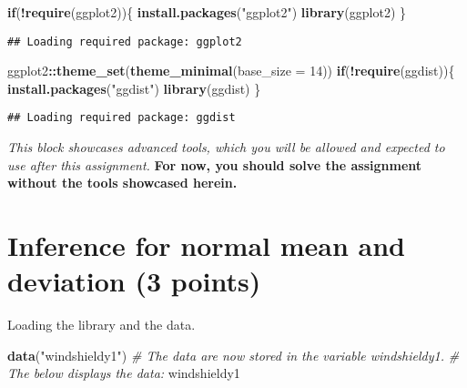\documentclass[
]{article}
\newenvironment{Shaded}{\begin{snugshade}}{\end{snugshade}}
\newcommand{\AttributeTok}[1]{\textcolor[rgb]{0.13,0.29,0.53}{#1}}
\newcommand{\CommentTok}[1]{\textcolor[rgb]{0.56,0.35,0.01}{\textit{#1}}}
\newcommand{\ControlFlowTok}[1]{\textcolor[rgb]{0.13,0.29,0.53}{\textbf{#1}}}
\newcommand{\DecValTok}[1]{\textcolor[rgb]{0.00,0.00,0.81}{#1}}
\newcommand{\FunctionTok}[1]{\textcolor[rgb]{0.13,0.29,0.53}{\textbf{#1}}}
\newcommand{\NormalTok}[1]{#1}
\newcommand{\SpecialCharTok}[1]{\textcolor[rgb]{0.81,0.36,0.00}{\textbf{#1}}}
\newcommand{\StringTok}[1]{\textcolor[rgb]{0.31,0.60,0.02}{#1}}
\begin{document}
\begin{Shaded}
\begin{Highlighting}[]
\ControlFlowTok{if}\NormalTok{(}\SpecialCharTok{!}\FunctionTok{require}\NormalTok{(ggplot2))\{}
    \FunctionTok{install.packages}\NormalTok{(}\StringTok{"ggplot2"}\NormalTok{)}
    \FunctionTok{library}\NormalTok{(ggplot2)}
\NormalTok{\}}
\end{Highlighting}
\end{Shaded}

\begin{verbatim}
## Loading required package: ggplot2
\end{verbatim}

\begin{Shaded}
\begin{Highlighting}[]
\NormalTok{ggplot2}\SpecialCharTok{::}\FunctionTok{theme\_set}\NormalTok{(}\FunctionTok{theme\_minimal}\NormalTok{(}\AttributeTok{base\_size =} \DecValTok{14}\NormalTok{))}
\ControlFlowTok{if}\NormalTok{(}\SpecialCharTok{!}\FunctionTok{require}\NormalTok{(ggdist))\{}
    \FunctionTok{install.packages}\NormalTok{(}\StringTok{"ggdist"}\NormalTok{)}
    \FunctionTok{library}\NormalTok{(ggdist)}
\NormalTok{\}}
\end{Highlighting}
\end{Shaded}

\begin{verbatim}
## Loading required package: ggdist
\end{verbatim}

\emph{This block showcases advanced tools, which you will be allowed and
expected to use after this assignment.} \textbf{For now, you should
solve the assignment without the tools showcased herein.}

\hypertarget{inference-for-normal-mean-and-deviation-3-points}{%
\section{Inference for normal mean and deviation (3
points)}\label{inference-for-normal-mean-and-deviation-3-points}}

Loading the library and the data.

\begin{Shaded}
\begin{Highlighting}[]
\FunctionTok{data}\NormalTok{(}\StringTok{"windshieldy1"}\NormalTok{)}
\CommentTok{\# The data are now stored in the variable \textasciigrave{}windshieldy1\textasciigrave{}.}
\CommentTok{\# The below displays the data:}
\NormalTok{windshieldy1}
\end{Highlighting}
\end{Shaded}
\end{document}
